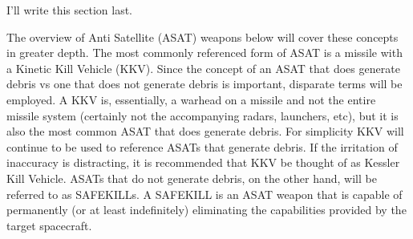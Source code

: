 {}

\titlenote{}

\maketitle

\thispagestyle{firstPage}

I’ll write this section last.

The overview of Anti Satellite (ASAT) weapons below will cover these
concepts in greater depth.  The most commonly referenced form of ASAT
is a missile with a Kinetic Kill Vehicle (KKV).  Since the concept of
an ASAT that does generate debris vs one that does not generate debris
is important, disparate terms will be employed.  A KKV is,
essentially, a warhead on a missile and not the entire missile system
(certainly not the accompanying radars, launchers, etc), but it is
also the most common ASAT that does generate debris.  For simplicity
KKV will continue to be used to reference ASATs that generate debris.
If the irritation of inaccuracy is distracting, it is recommended that
KKV be thought of as Kessler Kill Vehicle.  ASATs that do not generate
debris, on the other hand, will be referred to as SAFEKILLs.  A
SAFEKILL is an ASAT weapon that is capable of permanently (or at least
indefinitely) eliminating the capabilities provided by the target
spacecraft.
